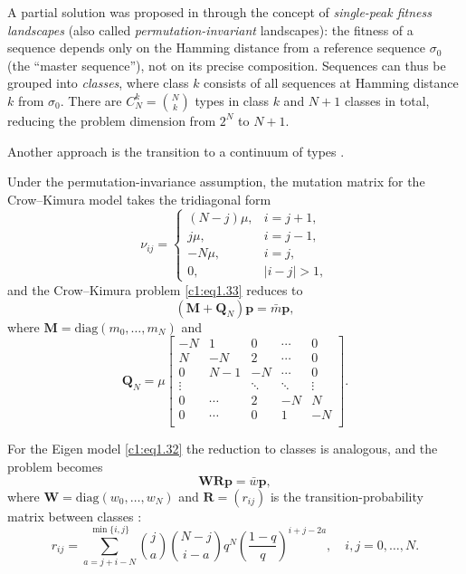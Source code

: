 \documentclass[12pt]{report}
\newcommand{\bs}[1]{\bm{#1}}
\theoremstyle{definition}
\theoremstyle{remark}
\begin{document}
A partial solution was proposed in \cite{c1:Swetina1982} through the
concept of \emph{single-peak fitness landscapes} (also called
\emph{permutation-invariant} landscapes): the fitness of a sequence
depends only on the Hamming distance from a reference sequence
$\sigma_0$ (the ``master sequence''), not on its precise composition.
Sequences can thus be grouped into \emph{classes}, where class $k$
consists of all sequences at Hamming distance $k$ from $\sigma_0$.
There are $C_N^k=\binom{N}{k}$ types in class $k$ and $N+1$ classes
in total, reducing the problem dimension from $2^N$ to $N+1$.

Another approach is the transition to a continuum of
types \cite{c1:Saakian2004,c1:Saakian2006}.

Under the permutation-invariance assumption, the mutation matrix for
the Crow--Kimura model takes the tridiagonal form
\begin{equation}
  \nu_{ij}=\begin{cases}
    (N-j)\mu, & i=j+1,\\
    j\mu, & i=j-1,\\
    -N\mu, & i=j,\\
    0, & |i-j|>1,
  \end{cases}
  \label{c1:eq1.36}
\end{equation}
and the Crow--Kimura problem \eqref{c1:eq1.33} reduces to
\begin{equation}
  (\bs{M}+\bs{Q}_N)\bs{p}=\bar{m}\bs{p},
  \label{c1:eq1.37}
\end{equation}
where $\bs{M}=\mathrm{diag}(m_0,\ldots,m_N)$ and
\begin{equation}
  \bs{Q}_N=\mu
  \begin{bmatrix}
    -N & 1 & 0 & \cdots & 0\\
    N & -N & 2 & \cdots & 0\\
    0 & N-1 & -N & \cdots & 0\\
    \vdots & & \ddots & \ddots & \vdots\\
    0 & \cdots & 2 & -N & N\\
    0 & \cdots & 0 & 1 & -N\\
  \end{bmatrix}.
  \label{c1:eq1.38}
\end{equation}

For the Eigen model \eqref{c1:eq1.32} the reduction to classes is
analogous, and the problem becomes
\begin{equation}
  \bs{WR}\bs{p}=\bar{w}\bs{p},
  \label{c1:eq1.39}
\end{equation}
where $\bs{W}=\mathrm{diag}(w_0,\ldots,w_N)$ and
$\bs{R}=(r_{ij})$ is the transition-probability matrix between classes
\cite{c1:Nowak1989}:
\begin{equation}
  r_{ij}=\sum_{a=j+i-N}^{\min\{i,j\}}
  \binom{j}{a}\binom{N-j}{i-a}q^N\!\left(\frac{1-q}{q}\right)^{i+j-2a},
  \quad i,j=0,\ldots,N.
  \label{c1:eq1.40}
\end{equation}
\end{document}
